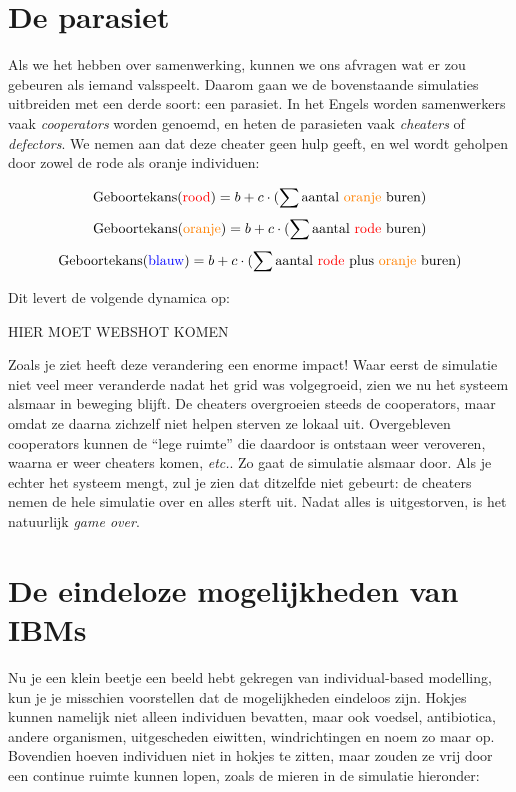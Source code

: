 \documentclass[
  a4paper,
]{scrbook}
\theoremstyle{definition}
\theoremstyle{remark}
\begin{document}
\hypertarget{de-parasiet}{%
\section{De parasiet}\label{de-parasiet}}

Als we het hebben over samenwerking, kunnen we ons afvragen wat er zou
gebeuren als iemand valsspeelt. Daarom gaan we de bovenstaande
simulaties uitbreiden met een derde soort: een {parasiet}. In het Engels
worden samenwerkers vaak \emph{cooperators} worden genoemd, en heten de
parasieten vaak \emph{cheaters} of \emph{defectors}. We nemen aan dat
deze cheater geen hulp geeft, en wel wordt geholpen door zowel de rode
als oranje individuen:

\[ \text{Geboortekans(\color{red}rood\color{black})} = b+c\cdot (\sum{\text{aantal \color{orange}oranje \color{black} buren}})\]
\[\text{Geboortekans(\color{orange}oranje\color{black})} = b+c\cdot (\sum{\text{aantal \color{red} rode \color{black} buren}})\]
\[\text{Geboortekans(\color{blue}blauw\color{black})} = b+c\cdot (\sum{\text{aantal \color{red} rode \color{black} plus \color{orange}oranje \color{black} buren}})\]

Dit levert de volgende dynamica op:

HIER MOET WEBSHOT KOMEN

Zoals je ziet heeft deze verandering een enorme impact! Waar eerst de
simulatie niet veel meer veranderde nadat het grid was volgegroeid, zien
we nu het systeem alsmaar in beweging blijft. De cheaters overgroeien
steeds de cooperators, maar omdat ze daarna zichzelf niet helpen sterven
ze lokaal uit. Overgebleven cooperators kunnen de ``lege ruimte'' die
daardoor is ontstaan weer veroveren, waarna er weer cheaters komen,
\emph{etc.}. Zo gaat de simulatie alsmaar door. Als je echter het
systeem mengt, zul je zien dat ditzelfde niet gebeurt: de cheaters nemen
de hele simulatie over en alles sterft uit. Nadat alles is uitgestorven,
is het natuurlijk \emph{game over}.

\hypertarget{de-eindeloze-mogelijkheden-van-ibms}{%
\section{De eindeloze mogelijkheden van
IBMs}\label{de-eindeloze-mogelijkheden-van-ibms}}

Nu je een klein beetje een beeld hebt gekregen van individual-based
modelling, kun je je misschien voorstellen dat de mogelijkheden
eindeloos zijn. Hokjes kunnen namelijk niet alleen individuen bevatten,
maar ook voedsel, antibiotica, andere organismen, uitgescheden eiwitten,
windrichtingen en noem zo maar op. Bovendien hoeven individuen niet in
hokjes te zitten, maar zouden ze vrij door een continue ruimte kunnen
lopen, zoals de mieren in de simulatie hieronder:
\end{document}

